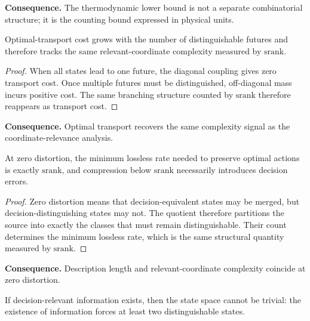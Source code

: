 \noindent\textbf{Consequence.} The thermodynamic lower bound is not a separate combinatorial structure; it is the counting bound expressed in physical units.

\begin{theorem}[Wasserstein Distance = Structural Rank]\label{thm:wasserstein-bridge}
Optimal-transport cost grows with the number of distinguishable futures and therefore tracks the same relevant-coordinate complexity measured by $\mathrm{srank}$.
\end{theorem}

\begin{proof}
When all states lead to one future, the diagonal coupling gives zero transport cost. Once multiple futures must be distinguished, off-diagonal mass incurs positive cost. The same branching structure counted by $\mathrm{srank}$ therefore reappears as transport cost.
\end{proof}

\noindent\textbf{Consequence.} Optimal transport recovers the same complexity signal as the coordinate-relevance analysis.

\begin{theorem}[Rate-Distortion = Structural Rank]\label{thm:rate-distortion-bridge}
At zero distortion, the minimum lossless rate needed to preserve optimal actions is exactly $\mathrm{srank}$, and compression below $\mathrm{srank}$ necessarily introduces decision errors.
\end{theorem}

\begin{proof}
Zero distortion means that decision-equivalent states may be merged, but decision-distinguishing states may not. The quotient therefore partitions the source into exactly the classes that must remain distinguishable. Their count determines the minimum lossless rate, which is the same structural quantity measured by $\mathrm{srank}$.
\end{proof}

\noindent\textbf{Consequence.} Description length and relevant-coordinate complexity coincide at zero distortion.

\begin{theorem}\label{thm:nontriviality-counting}
If decision-relevant information exists, then the state space cannot be trivial: the existence of information forces at least two distinguishable states.
\end{theorem}

